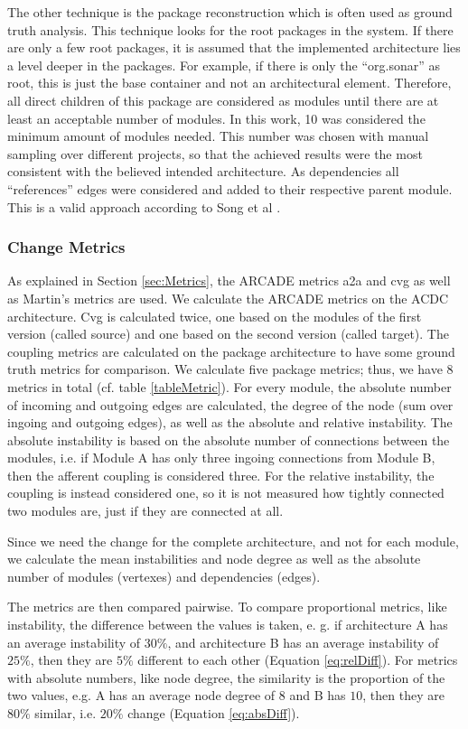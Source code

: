 \documentclass[sigplan, anonymous, review]{acmart}
\begin{document}
The other technique is the package reconstruction which is often used as ground truth analysis.
This technique looks for the root packages in the system. If there are only a few root packages, it is assumed that the implemented architecture lies a level deeper in the packages. For example, if there is only the ``org.sonar'' as root, this is just the base container and not an architectural element. Therefore, all direct children of this package are considered as modules until there are at least an acceptable number of modules. In this work, 10 was considered the minimum amount of modules needed. This number was chosen with manual sampling over different projects, so that the achieved results were the most consistent with the believed intended architecture. As dependencies all ``references'' edges were considered and added to their respective parent module. This is a valid approach according to Song et al \cite{ArcAsGraph}. 

\subsubsection{Change Metrics}

As explained in Section \ref{sec:Metrics}, the ARCADE metrics a2a and cvg as well as Martin's metrics are used. We calculate the ARCADE metrics on the ACDC architecture. Cvg is calculated twice, one based on the modules of the first version (called source) and one based on the second version (called target).
The coupling metrics are calculated on the package architecture to have some ground truth metrics for comparison. We calculate five package metrics; thus, we have 8 metrics in total (cf. table \ref{tableMetric}).
For every module, the absolute number of incoming and outgoing edges are calculated, the degree of the node (sum over ingoing and outgoing edges), as well as the absolute and relative instability. The absolute instability is based on the absolute number of connections between the modules, i.e. if Module A has only three ingoing connections from Module B, then the afferent coupling is considered three. For the relative instability, the coupling is instead considered one, so it is not measured how tightly connected two modules are, just if they are connected at all.

Since we need the change for the complete architecture, and not for each module, we calculate the mean instabilities and node degree as well as the absolute number of modules (vertexes) and dependencies (edges).

The metrics are then compared pairwise. To compare proportional metrics, like instability, the difference between the values is taken, e. g. if architecture A has an average instability of $30\%$, and architecture B has an average instability of $25\%$, then they are $5\%$ different to each other (Equation \ref{eq:relDiff}). For metrics with absolute numbers, like node degree, the similarity is the proportion of the two values, e.g. A has an average node degree of $8$ and B has $10$, then they are $80\%$ similar, i.e. $20\%$ change (Equation \ref{eq:absDiff}).
\end{document}
